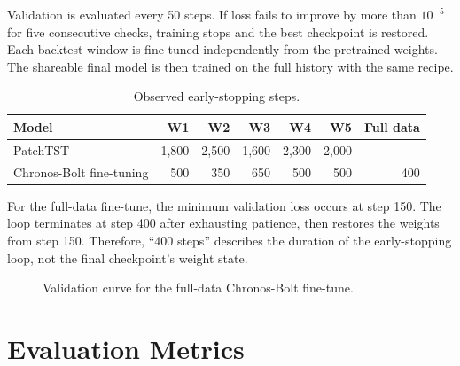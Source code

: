 \documentclass[11pt,a4paper]{article}
\begin{document}
Validation is evaluated every 50 steps. If loss fails to improve by more than $10^{-5}$ for five
consecutive checks, training stops and the best checkpoint is restored. Each backtest window is
fine-tuned independently from the pretrained weights. The shareable final model is then trained on
the full history with the same recipe.

\begin{table}[htbp]
\centering
\caption{Observed early-stopping steps.}
\label{tab:stopsteps}
\begin{tabular}{@{}lrrrrrr@{}}
\toprule
Model & W1 & W2 & W3 & W4 & W5 & Full data\\
\midrule
PatchTST & 1,800 & 2,500 & 1,600 & 2,300 & 2,000 & --\\
Chronos-Bolt fine-tuning & 500 & 350 & 650 & 500 & 500 & 400\\
\bottomrule
\end{tabular}
\end{table}

For the full-data fine-tune, the minimum validation loss occurs at step 150. The loop terminates at
step 400 after exhausting patience, then restores the weights from step 150. Therefore, ``400
steps'' describes the duration of the early-stopping loop, not the final checkpoint's weight state.

\begin{figure}[htbp]
\centering
{}
\caption{Validation curve for the full-data Chronos-Bolt fine-tune.}
\label{fig:ftcurve}
\end{figure}

\section{Evaluation Metrics}
\end{document}
